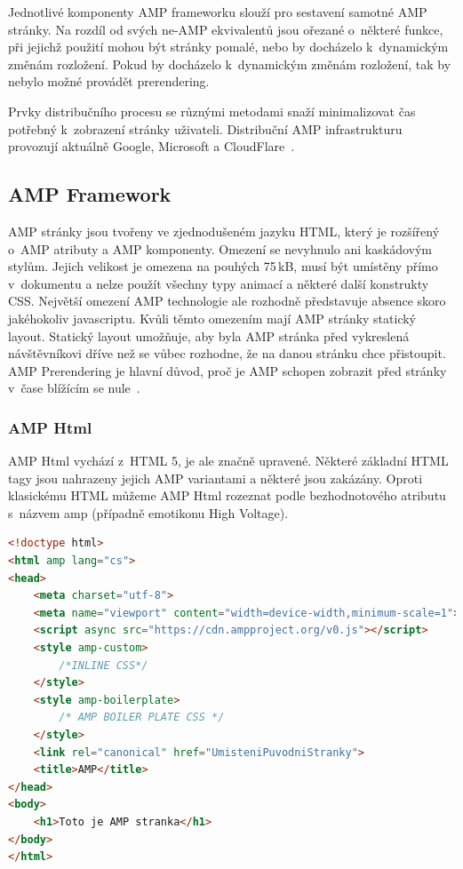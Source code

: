 Jednotlivé komponenty AMP frameworku slouží pro sestavení samotné AMP stránky. Na rozdíl od svých
ne-AMP ekvivalentů jsou ořezané o~některé funkce, při jejichž použití mohou být stránky pomalé, nebo
by docházelo k~dynamickým změnám rozložení. Pokud by docházelo k~dynamickým změnám rozložení,
tak by nebylo možné provádět prerendering.

Prvky distribučního procesu se různými metodami snaží minimalizovat čas potřebný k~zobrazení stránky
uživateli. Distribuční AMP infrastrukturu provozují aktuálně Google, Microsoft a CloudFlare~\cite[Ch.\ 1, p.\ 49]{VzhuruDoAMP}.

\subsection*{AMP Framework}
AMP stránky jsou tvořeny ve zjednodušeném jazyku HTML, který je rozšířený o~AMP atributy a AMP
komponenty. Omezení se nevyhnulo ani kaskádovým stylům. Jejich velikost je omezena na pouhých
75\,kB, musí být umístěny přímo v~dokumentu a nelze použít všechny typy animací a některé další
konstrukty CSS.
Největší omezení AMP technologie ale rozhodně představuje absence skoro jakéhokoliv javascriptu.
Kvůli těmto omezením mají AMP stránky statický layout. Statický layout umožňuje, aby byla AMP stránka před vykreslená návštěvníkovi dříve než se vůbec rozhodne, že na danou stránku chce přistoupit. AMP Prerendering je hlavní důvod, proč je AMP schopen zobrazit před stránky v~čase blížícím se nule~\cite{AMP-zero}.
\subsubsection*{AMP Html}
AMP Html vychází z~HTML 5, je ale značně upravené. Některé základní HTML tagy jsou nahrazeny jejich AMP variantami a některé jsou zakázány.
Oproti klasickému HTML můžeme AMP Html rozeznat podle bezhodnotového atributu s~názvem amp (případně emotikonu High Voltage).

\begin{lstlisting}[language=html, caption=Ukázka AMP Html,captionpos=t]
<!doctype html>
<html amp lang="cs">
<head>
    <meta charset="utf-8">
    <meta name="viewport" content="width=device-width,minimum-scale=1">
    <script async src="https://cdn.ampproject.org/v0.js"></script>
    <style amp-custom>
        /*INLINE CSS*/
    </style>
    <style amp-boilerplate>
        /* AMP BOILER PLATE CSS */
    </style>
    <link rel="canonical" href="UmisteniPuvodniStranky">
    <title>AMP</title>
</head>
<body>
    <h1>Toto je AMP stranka</h1>
</body>
</html>

\end{lstlisting}

